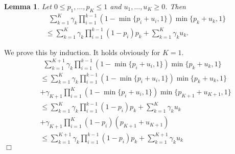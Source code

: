 \documentclass{article}
\newtheorem{lemma}[theorem]{Lemma}%
\newenvironment{proof}{\noindent {\textbf{Proof. }}}{$\Box$ \medskip}
\begin{document}
	\begin{lemma}
		\label{lem:estimateTech}
		Let $0 \leq p_1,...,p_K \leq 1$ and $u_1,...,u_K \geq 0$. Then
		\begin{align*}
		&~~\sum_{k=1}^K \gamma_k\prod_{i=1}^{k-1}(1-\min\{p_i+u_i, 1\})\min\{p_k+u_k, 1\} \\
		& \leq \sum_{k=1}^K \gamma_k\prod_{i=1}^{k-1}(1-p_i)p_k + \sum_{k=1}^K \gamma_k u_k.
		\end{align*}
	\end{lemma}
	\begin{proof}
		We prove this by induction. It holds obviously for $K=1$.
		\begin{align*}
		&~~\sum_{k=1}^{K+1} \gamma_k\prod_{i=1}^{k-1}(1-\min\{p_i+u_i, 1\})\min\{p_k+u_k, 1\} \\
		&\leq \sum_{k=1}^K \gamma_k\prod_{i=1}^{k-1}(1-\min\{p_i+u_i, 1\})\min\{p_k+u_k, 1\}\\
		&+\gamma_{K+1}\prod_{i=1}^{K}(1-\min\{p_i+u_i, 1\})\min\{p_{K+1}+u_{K+1}, 1\}\\
		&\leq \sum_{k=1}^K \gamma_k\prod_{i=1}^{k-1}(1-p_i)p_k + \sum_{k=1}^K \gamma_k u_k\\
		&+\gamma_{K+1}\prod_{i=1}^{K}(1-p_i)(p_{K+1}+u_{K+1})\\
		&\leq \sum_{k=1}^{K+1} \gamma_k\prod_{i=1}^{k-1}(1-p_i)p_k + \sum_{k=1}^{K+1} \gamma_k u_k
		\end{align*}
	\end{proof}
	
\end{document}
